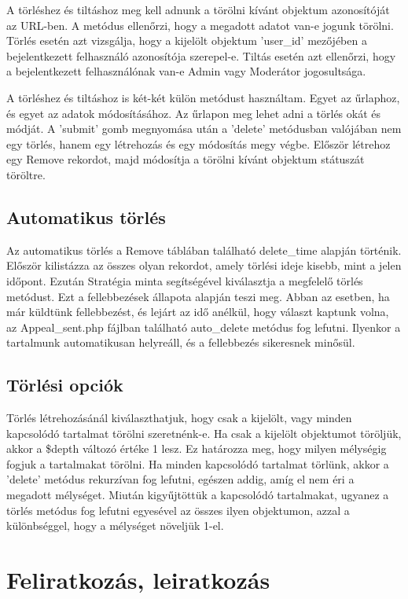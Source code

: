 \documentclass[
]{thesis-ekf}
\theoremstyle{definition}
\theoremstyle{remark}
\begin{document}
A törléshez és tiltáshoz meg kell adnunk a törölni kívánt objektum azonosítóját az URL-ben. A metódus ellenőrzi, hogy a megadott adatot van-e jogunk törölni. Törlés esetén azt vizsgálja, hogy a kijelölt objektum 'user\_id' mezőjében a bejelentkezett felhasználó azonosítója szerepel-e. Tiltás esetén azt ellenőrzi, hogy a bejelentkezett felhasználónak van-e Admin vagy Moderátor jogosultsága.

A törléshez és tiltáshoz is két-két külön metódust használtam. Egyet az űrlaphoz, és egyet az adatok módosításához. Az űrlapon meg lehet adni a törlés okát és módját. A 'submit' gomb megnyomása után a 'delete' metódusban valójában nem egy törlés, hanem egy létrehozás és egy módosítás megy végbe. Először létrehoz egy Remove rekordot, majd módosítja a törölni kívánt objektum státuszát töröltre.

\subsection{Automatikus törlés}

Az automatikus törlés a Remove táblában található delete\_time alapján történik. Először kilistázza az összes olyan rekordot, amely törlési ideje kisebb, mint a jelen időpont. Ezután Stratégia minta segítségével kiválasztja a megfelelő törlés metódust. Ezt a fellebbezések állapota alapján teszi meg. Abban az esetben, ha már küldtünk fellebbezést, és lejárt az idő anélkül, hogy választ kaptunk volna, az Appeal\_sent.php fájlban található auto\_delete metódus fog lefutni. Ilyenkor a tartalmunk automatikusan helyreáll, és a fellebbezés sikeresnek minősül.

\subsection{Törlési opciók}

Törlés létrehozásánál kiválaszthatjuk, hogy csak a kijelölt, vagy minden kapcsolódó tartalmat törölni szeretnénk-e. Ha csak a kijelölt objektumot töröljük, akkor a \$depth változó értéke 1 lesz. Ez határozza meg, hogy milyen mélységig fogjuk a tartalmakat törölni. Ha minden kapcsolódó tartalmat törlünk, akkor a 'delete' metódus rekurzívan fog lefutni, egészen addig, amíg el nem éri a megadott mélységet. Miután kigyűjtöttük a kapcsolódó tartalmakat, ugyanez a törlés metódus fog lefutni egyesével az összes ilyen objektumon, azzal a különbséggel, hogy a mélységet növeljük 1-el.

\section{Feliratkozás, leiratkozás}
\end{document}
